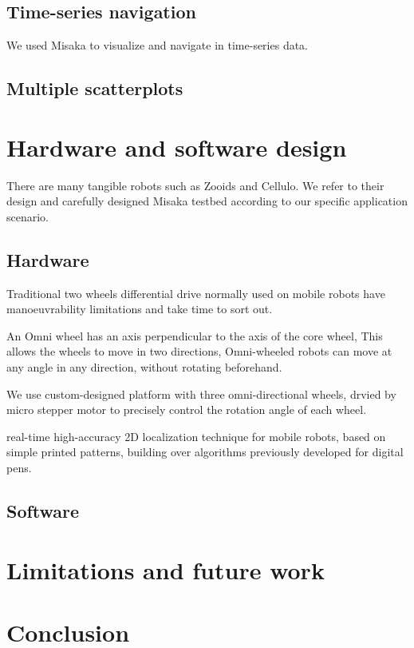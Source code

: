 \documentclass[conference]{IEEEtran}
\begin{document}
\subsection{Time-series navigation}

We used Misaka to visualize and navigate in time-series data.

\subsection{Multiple scatterplots}


\section{Hardware and software design}

There are many tangible robots such as Zooids\cite{le2016zooids} and Cellulo\cite{ozgur2017cellulo}. We refer to their design and carefully designed Misaka testbed according to our specific application scenario.

\subsection{Hardware}

Traditional two wheels differential drive normally used on mobile robots have manoeuvrability limitations and take time to sort out\cite{ribeiro2004three}. 

An Omni wheel has an axis perpendicular to the axis of the core wheel, This allows the wheels to move in two directions, Omni-wheeled robots can move at any angle in any direction, without rotating beforehand.

We use custom-designed platform with three omni-directional wheels, drvied by micro stepper motor to precisely control the rotation angle of each wheel.

real-time high-accuracy 2D localization technique for mobile robots, based on simple printed patterns, building over algorithms previously developed for digital pens\cite{hostettler2016real}.



\subsection{Software}

\section{Limitations and future work}

\section{Conclusion}






\end{document}
